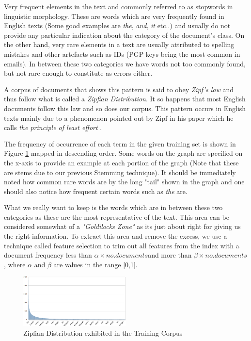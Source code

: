 Very frequent elements in the text and commonly referred to as stopwords in linguistic morphology. These are words which are very frequently found in English texts (Some good examples are \emph{the}, \emph{and}, \emph{it} etc..) and usually do not provide any particular indication about the category of the document's class. On the other hand, very rare elements in a text are usually attributed to spelling mistakes and other artefacts such as IDs (PGP keys being the most common in emails). In between these two categories we have words not too commonly found, but not rare enough to constitute as errors either.

A corpus of documents that shows this pattern is said to obey \emph{Zipf's law} and thus follow what is called a \emph{Zipfian Distribution}. It so happens that most English documents follow this law and so does our corpus. This pattern occurs in English texts mainly due to a phenomenon pointed out by Zipf in his paper which he calls  \emph{the principle of least effort} \cite{zipf1949} .

The frequency of occurrence of each term in the given training set is shown in Figure \ref{zipfian}  mapped in descending order. Some words on the graph are specified on the x-axis to provide an example at each portion of the graph (Note that these are stems due to our previous Stemming technique). It should be immediately noted how common rare words are by the long "tail" shown in the graph and one should also notice how frequent certain words such as \emph{the} are.

What we really want to keep is the words which are in between these two categories as these are the most representative of the text. This area can be considered somewhat of a \emph{"Goldilocks Zone"} as its just about right for giving us the right information. To extract this area and remove the excess, we use a technique called feature selection to trim out all features from the index with a document frequency less than \(\alpha \times no. documents\)and more than \(\beta \times no. documents\), where \(\alpha\) and \(\beta\) are values in the range [0,1].

\begin{figure}[h!]
	\label{zipfian}
    \centering
    \includegraphics[width=0.5\textwidth]{zipfian.png}
    \caption{Zipfian Distribution exhibited in the Training Corpus}
    \label{zipfian}
\end{figure}

